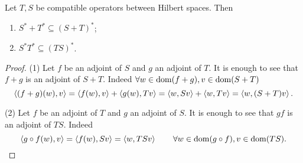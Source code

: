 \begin{proposition} \label{adjointAlgebraicProperties}
Let $T,S$ be compatible operators between Hilbert spaces. Then
\begin{enumerate}
\item $S^* + T^* \subseteq (S+T)^*$;
\item $S^*T^* \subseteq (TS)^*$.
\end{enumerate}
\end{proposition}
\begin{proof}
(1) Let $f$ be an adjoint of $S$ and $g$ an adjoint of $T$. It is enough to see that $f+g$ is an adjoint of $S+T$. Indeed $\forall w\in \operatorname{dom}(f + g), v\in \operatorname{dom}(S+T)$
\[ \left\langle (f + g)(w), v \right\rangle = \left\langle f(w),v \right\rangle + \left\langle g(w), Tv \right\rangle = \left\langle w,Sv \right\rangle + \left\langle w,Tv \right\rangle = \left\langle w,(S+T)v \right\rangle. \]

(2) Let $f$ be an adjoint of $T$ and $g$ an adjoint of $S$. It is enough to see that $gf$ is an adjoint of $TS$. Indeed
\[ \left\langle g\circ f(w), v \right\rangle = \left\langle f(w), Sv \right\rangle = \left\langle w,TSv \right\rangle \qquad \forall w\in \operatorname{dom}(g\circ f), v\in \operatorname{dom}(TS). \]
\end{proof}



